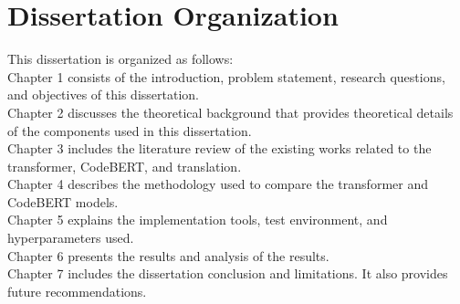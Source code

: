 \section{Dissertation Organization}
This dissertation is organized as follows: \\
Chapter 1 consists of the introduction, problem statement, research questions, and objectives of this dissertation. \\
Chapter 2 discusses the theoretical background that provides theoretical details of the components used in this dissertation. \\
Chapter 3 includes the literature review of the existing works related to the transformer, CodeBERT, and translation. \\
Chapter 4 describes the methodology used to compare the transformer and CodeBERT models. \\
Chapter 5 explains the implementation tools, test environment, and hyperparameters used. \\
Chapter 6 presents the results and analysis of the results. \\
Chapter 7 includes the dissertation conclusion and limitations. It also provides future recommendations.